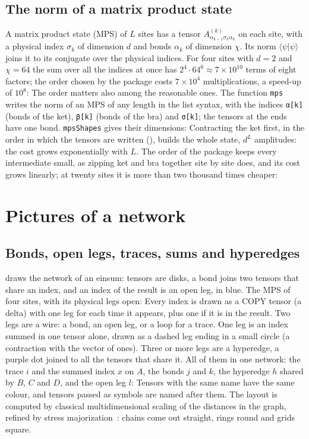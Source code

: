 \documentclass[11pt,a4paper]{article}
\begin{document}
\subsection{The norm of a matrix product state}\label{sec:mps}
A matrix product state (MPS) of $L$ sites has a tensor $A^{(k)}_{\alpha_{k-1}\sigma_k\alpha_k}$ on each site, with a
physical index $\sigma_k$ of dimension $d$ and bonds $\alpha_k$ of dimension $\chi$. Its norm
$\langle\psi|\psi\rangle$ joins it to its conjugate over the physical indices. For four sites with $d=2$ and $\chi=64$ the
sum over all the indices at once has $2^4\cdot64^6\approx7\times10^{10}$ terms of eight factors; the order chosen by the
package costs $7\times10^4$ multiplications, a speed-up of $10^8$:
The order matters also among the reasonable ones. The function \texttt{mps} writes the norm of an MPS of any length in the
list syntax, with the indices \texttt{α[k]} (bonds of the ket), \texttt{β[k]} (bonds of the bra) and \texttt{σ[k]}; the
tensors at the ends have one bond. \texttt{mpsShapes} gives their dimensions:
Contracting the ket first, in the order in which the tensors are written (), builds the whole state, $d^L$
amplitudes: the cost grows exponentially with $L$. The order of the package keeps every intermediate small, as zipping
ket and bra together site by site does, and its cost grows linearly; at twenty sites it is more than two thousand times
cheaper:

\section{Pictures of a network}\label{sec:pictures}

\subsection{Bonds, open legs, traces, sums and hyperedges}
 draws the network of an einsum: tensors are disks, a bond joins two tensors that share an index, and an
index of the result is an open leg, in blue. The MPS of four sites, with its physical legs open:
Every index is drawn as a COPY tensor (a delta) with one leg for each time it appears, plus one if it is in the result.
Two legs are a wire: a bond, an open leg, or a loop for a trace. One leg is an index summed in one tensor alone, drawn as
a dashed leg ending in a small circle (a contraction with the vector of ones). Three or more legs are a hyperedge, a purple
dot joined to all the tensors that share it. All of them in one network: the trace $i$ and the summed index $x$ on $A$,
the bonds $j$ and $k$, the hyperedge $h$ shared by $B$, $C$ and $D$, and the open leg $l$:
Tensors with the same name have the same colour, and tensors passed as symbols are named after them. The layout is
computed by classical multidimensional scaling of the distances in the graph, refined by stress
majorization~\cite{GKN04}: chains come out straight, rings round and grids square.
\end{document}
